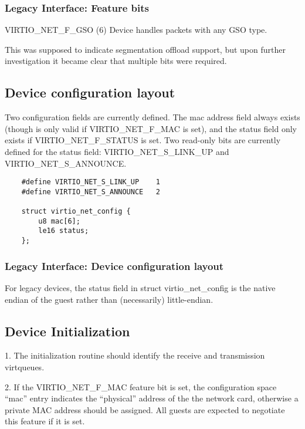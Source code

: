 \subsubsection{Legacy Interface: Feature bits}\label{sec:Device Types / Network Device / Feature bits / Legacy Interface: Feature bits}
VIRTIO_NET_F_GSO (6) Device handles packets with any GSO type.

This was supposed to indicate segmentation offload support, but
upon further investigation it became clear that multiple bits
were required.

\subsection{Device configuration layout}\label{sec:Device Types / Network Device / Device configuration layout}

Two configuration fields are currently defined. The mac address field
always exists (though is only valid if VIRTIO_NET_F_MAC is set), and
the status field only exists if VIRTIO_NET_F_STATUS is set. Two
read-only bits are currently defined for the status field:
VIRTIO_NET_S_LINK_UP and VIRTIO_NET_S_ANNOUNCE.

\begin{lstlisting}
	#define VIRTIO_NET_S_LINK_UP	1
	#define VIRTIO_NET_S_ANNOUNCE	2

	struct virtio_net_config {
		u8 mac[6];
		le16 status;
	};
\end{lstlisting}

\subsubsection{Legacy Interface: Device configuration layout}\label{sec:Device Types / Network Device / Device configuration layout / Legacy Interface: Device configuration layout}
For legacy devices, the status field in struct virtio_net_config is the
native endian of the guest rather than (necessarily) little-endian.


\subsection{Device Initialization}\label{sec:Device Types / Network Device / Device Initialization}

1. The initialization routine should identify the receive and
  transmission virtqueues.

2. If the VIRTIO_NET_F_MAC feature bit is set, the configuration
  space “mac” entry indicates the “physical” address of the the
  network card, otherwise a private MAC address should be
  assigned. All guests are expected to negotiate this feature if
  it is set.

